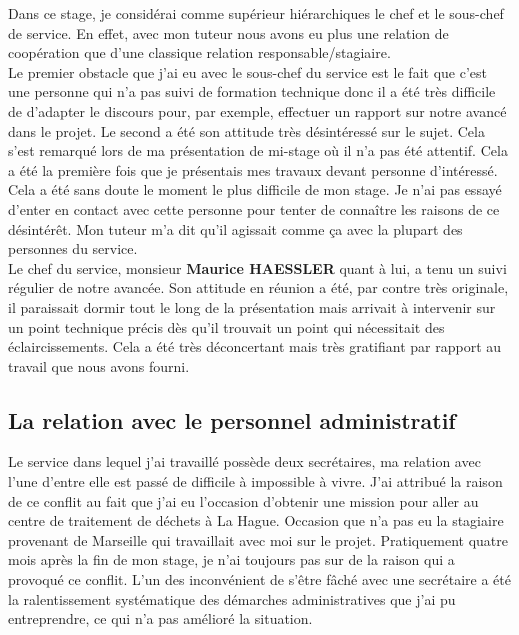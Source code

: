 \documentclass[a4paper,11pt]{article}
\begin{document}
\normalsize{
Dans ce stage, je considérai comme supérieur hiérarchiques le chef et le sous-chef de service. En effet, avec mon tuteur nous avons eu plus une relation de coopération que d'une classique relation responsable/stagiaire. \\

Le premier obstacle que j'ai eu avec le sous-chef du service est le fait que c'est une personne qui n'a pas suivi de formation technique donc il a été très difficile de d'adapter le discours pour, par exemple, effectuer un rapport sur notre avancé dans le projet. Le second a été son attitude très désintéressé sur le sujet. Cela s'est remarqué lors de ma présentation de mi-stage où il n'a  pas été attentif. Cela a été la première fois que je présentais mes travaux devant personne d'intéressé. Cela a été sans doute le moment le plus difficile de mon stage. Je n'ai pas essayé d'enter en contact avec cette personne pour tenter de connaître les raisons de ce désintérêt. Mon tuteur m'a dit qu'il agissait comme ça avec la plupart des personnes du service. \\
 
Le chef du service, monsieur {\bf Maurice HAESSLER} quant à lui, a tenu un suivi régulier de notre avancée. Son attitude en réunion a été, par contre très originale, il paraissait dormir tout le long de la présentation mais arrivait à intervenir sur un point technique précis dès qu'il trouvait un point qui nécessitait des éclaircissements. Cela a été très déconcertant mais très gratifiant par rapport au travail que nous avons fourni. 
}

\subsection{La relation avec le personnel administratif}

\normalsize{
Le service dans lequel j'ai travaillé possède deux secrétaires, ma relation avec l'une d'entre elle est passé de difficile à impossible à vivre. J'ai attribué la raison de ce conflit au fait que j'ai eu l'occasion d'obtenir une mission pour aller au centre de traitement de déchets à La Hague. Occasion que n'a pas eu la stagiaire provenant de Marseille qui travaillait avec moi sur le projet. Pratiquement quatre mois après la fin de mon stage, je n'ai toujours pas sur de la raison qui a provoqué ce conflit. L'un des inconvénient de s'être fâché avec une secrétaire a été la ralentissement systématique des démarches administratives que j'ai pu entreprendre, ce qui n'a pas amélioré la situation. 
}
\end{document}
